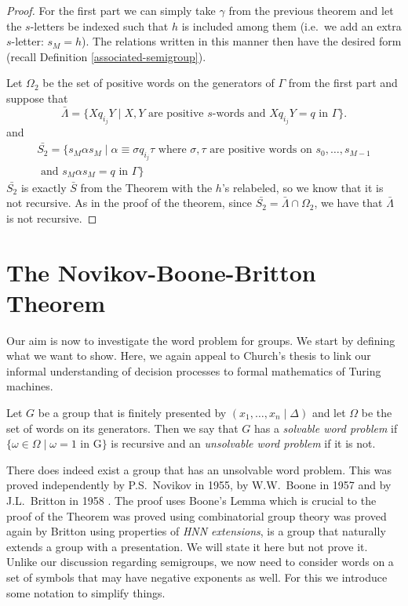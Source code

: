 \begin{proof}
  For the first part we can simply take $\gamma$ from the previous theorem and let the $s$-letters be indexed such that $h$ is included among them (i.e.\ we add an extra $s$-letter: $s_M = h$). The relations written in this manner then have the desired form (recall Definition \ref{associated-semigroup}).

  Let $\Omega_2$ be the set of positive words on the generators of $\Gamma$ from the first part and suppose that
  \begin{equation*}
    \bar{\Lambda} = \{Xq_{i_j}Y  \mid X,Y \text{ are positive }s\text{-words and } Xq_{i_j}Y = q \text{ in } \Gamma\}.
  \end{equation*}
  and 
  \begin{gather*}
    \bar{S_2} = \{s_M\alpha s_M \mid \alpha \equiv \sigma q_{i_j} \tau \text{ where } \sigma,\tau \text{ are positive words on } s_0,\dots,s_{M-1} \\
    \text{ and } s_M\alpha s_M = q \text{ in } \Gamma\}
  \end{gather*}
  $\bar{S_2}$ is exactly $\bar{S}$ from the Theorem with the $h$'s relabeled, so we know that it is not recursive. As in the proof of the theorem, since $\bar{S_2} = \bar{\Lambda} \cap \Omega_2$, we have that $\bar{\Lambda}$ is not recursive.
\end{proof}

\section{The Novikov-Boone-Britton Theorem}

Our aim is now to investigate the word problem for groups. We start by defining what we want to show. Here, we again appeal to Church's thesis to link our informal understanding of decision processes to formal mathematics of Turing machines.

\begin{definition}
  Let $G$ be a group that is finitely presented by $(x_1,\dots,x_n \mid \Delta)$ and let $\Omega$ be the set of words on its generators. Then we say that $G$ has a \emph{solvable word problem} if $\{\omega \in \Omega \mid \omega = 1 \text{ in G}\}$ is recursive and an \emph{unsolvable word problem} if it is not.
\end{definition}

There does indeed exist a group that has an unsolvable word problem. This was proved independently by P.S.\ Novikov in 1955, by W.W.\ Boone in 1957 and by J.L.\ Britton in 1958 \cite{rotman1999introduction}. The proof uses Boone's Lemma which is crucial to the proof of the Theorem was proved using combinatorial group theory was proved again by Britton using properties of \emph{HNN extensions}, is a group that naturally extends a group with a presentation. We will state it here but not prove it. Unlike our discussion regarding semigroups, we now need to consider words on a set of symbols that  may have negative exponents as well. For this we introduce some notation to simplify things.

